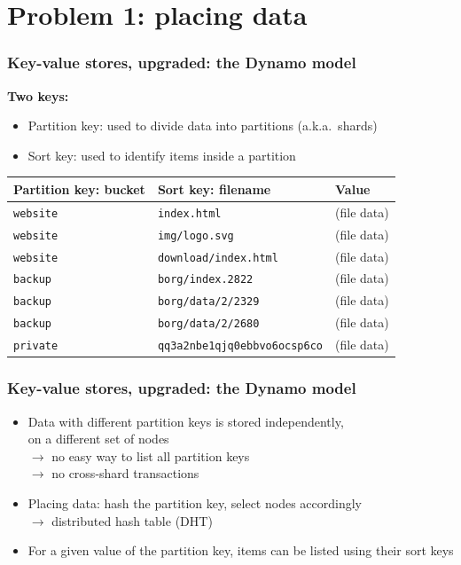 \documentclass[aspectratio=169]{beamer}
\begin{document}
\section{Problem 1: placing data}

\begin{frame}
	\frametitle{Key-value stores, upgraded: the Dynamo model}
	\textbf{Two keys:}
	\begin{itemize}
		\item Partition key: used to divide data into partitions {\small (a.k.a.~shards)}
		\item Sort key: used to identify items inside a partition
	\end{itemize}

	\vspace{1em}

	\begin{center}
	\begin{tabular}{|l|l|p{3cm}|}
		\hline
		\textbf{Partition key: bucket} & \textbf{Sort key: filename} & \textbf{Value} \\
		\hline
		\hline
		\texttt{website} & \texttt{index.html} & (file data) \\
		\hline
		\texttt{website} & \texttt{img/logo.svg} & (file data) \\
		\hline
		\texttt{website} & \texttt{download/index.html} & (file data) \\
		\hline
		\hline
		\texttt{backup} & \texttt{borg/index.2822} & (file data) \\
		\hline
		\texttt{backup} & \texttt{borg/data/2/2329} & (file data) \\
		\hline
		\texttt{backup} & \texttt{borg/data/2/2680} & (file data) \\
		\hline
		\hline
		\texttt{private} & \texttt{qq3a2nbe1qjq0ebbvo6ocsp6co} & (file data) \\
		\hline
	\end{tabular}
	\end{center}
\end{frame}

\begin{frame}
	\frametitle{Key-value stores, upgraded: the Dynamo model}
	\begin{itemize}
		\item Data with different partition keys is stored independently,\\
			on a different set of nodes\\
			\vspace{.5em}
			$\to$ no easy way to list all partition keys\\
			$\to$ no cross-shard transactions\\
			\vspace{2em}
		\item Placing data: hash the partition key, select nodes accordingly\\
			\vspace{.5em}
			$\to$ distributed hash table (DHT)
			\vspace{2em}
		\item For a given value of the partition key, items can be listed using their sort keys
	\end{itemize}
\end{frame}
\end{document}
